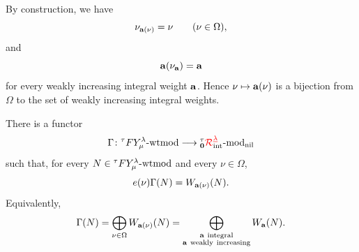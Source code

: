 By construction, we have
\[
   \nu_{\mathbf{a}(\nu)}=\nu
   \qquad (\nu\in\Omega),
\]
and
\[
   \mathbf{a}(\nu_{\mathbf{a}})=\mathbf{a}
\]
for every weakly increasing integral weight \(\mathbf{a}\). Hence
\(\nu\mapsto\mathbf{a}(\nu)\) is a bijection from \(\Omega\) to the set of
weakly increasing integral weights.


\begin{prop}\label{prop:Gamma}
There is a functor
\[
   \Gamma\colon{}^\tau F Y_\mu^\lambda\text{-wtmod}\longrightarrow{{}^\tau_{\mathbf{0}}{\color{red}\mathcal{R}}^{{{\color{red}\underline{\lambda}}}}_{\text{int}}}\text{-mod}_{\text{nil}}
\]
such that, for every \(N\in{}^\tau F Y_\mu^\lambda\text{-wtmod}\) and every \(\nu\in\Omega\),
\begin{equation}
\label{eq:Gamma-idem}
   e(\nu)\Gamma(N)=W_{\mathbf{a}(\nu)}(N).
\end{equation}
Equivalently,
\begin{equation}
\label{eq:Gamma}
   \Gamma(N)
   =
   \bigoplus_{\nu\in\Omega}W_{\mathbf{a}(\nu)}(N)
   =
   \bigoplus_{\substack{\mathbf{a}\ \mathrm{integral}\\
                        \mathbf{a}\ \mathrm{weakly\ increasing}}}
   W_{\mathbf{a}}(N).
\end{equation}
\end{prop}


